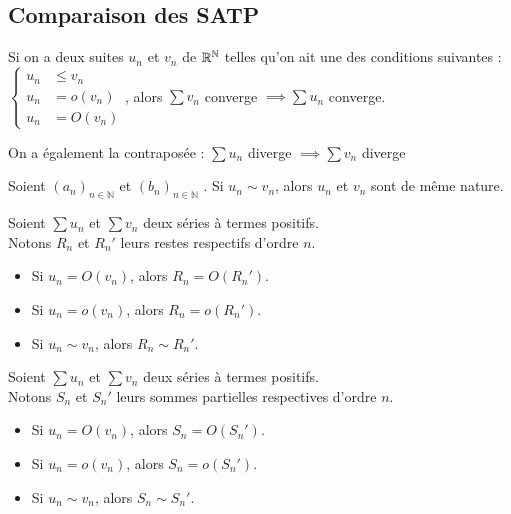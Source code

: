 \documentclass[11pt,a4paper,fleqn,pdftex]{report}
\begin{document}
\subsection{Comparaison des \gls{SATP}} %
\label{sub:comparaison_des_satp}
\begin{theorem}
    Si on a deux suites $u_n$ et $v_n$ de $\mathbb{R}{}^\mathbb{N}$ telles qu'on ait une des conditions suivantes : $
    \left\lbrace
    \begin{aligned}
        u_n &\le v_n    \\
        u_n &= o(v_n)   \\
        u_n &= O(v_n)
    \end{aligned}
    \right. $, alors $\sum v_n$ converge $\implies \sum u_n$ converge. \par

    On a également la contraposée : 
    $\sum u_n$ diverge $\implies \sum v_n$ diverge
\end{theorem}
\begin{theorem}
     Soient $(a_n)_{n\in \mathbb{N}}$ et $(b_n)_{n\in \mathbb{N}}$ . \newline
     Si $u_n \sim v_n$, alors $u_n$ et $v_n$ sont de même nature.
\end{theorem}
\begin{itheorem}
     Soient $\sum u_n$ et $\sum v_n$ deux séries  à termes positifs.\\
     Notons $R_n$ et $R_n'$ leurs restes respectifs d'ordre $n$.
     \begin{itemize}
         \item Si $u_n = O(v_n)$, alors $R_n = O(R_n')$. 
         \item Si $u_n = o(v_n)$, alors $R_n = o(R_n')$. 
         \item Si $u_n \sim v_n$, alors $R_n \sim R_n'$. 
     \end{itemize}
\end{itheorem}
\begin{itheorem}
     Soient $\sum u_n$ et $\sum v_n$ deux séries  à termes positifs.\\
     Notons $S_n$ et $S_n'$ leurs sommes partielles respectives d'ordre $n$.
     \begin{itemize}
         \item Si $u_n = O(v_n)$, alors $S_n = O(S_n')$. 
         \item Si $u_n = o(v_n)$, alors $S_n = o(S_n')$. 
         \item Si $u_n \sim v_n$, alors $S_n \sim S_n'$. 
     \end{itemize}
\end{itheorem}
\end{document}
